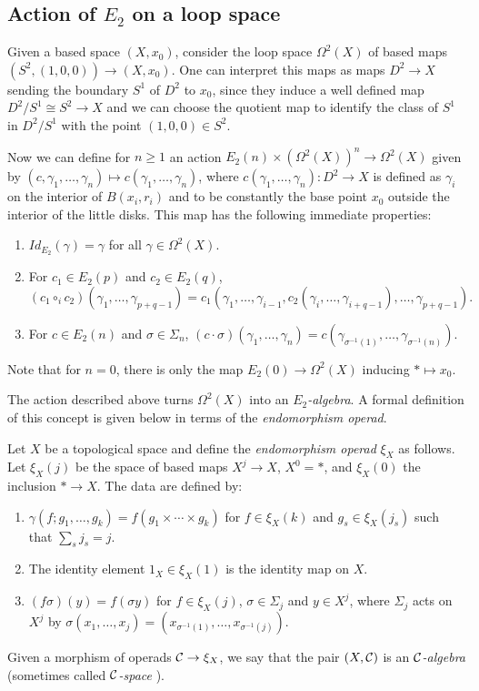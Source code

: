 \documentclass[TFM.tex]{subfiles}
\begin{document}
\subsection{Action of $E_2$ on a loop space}
Given a based space $(X,x_0)$, consider the loop space $\Omega^2(X)$ of based maps $(S^2, (1,0,0))\to (X, x_0)$. One can interpret this maps as maps $D^2\to X$ sending the boundary $S^1$ of $D^2$ to $x_0$, since they induce a well defined map $D^2/S^1\cong S^2\to X$ and we can choose the quotient map to identify the class of $S^1$ in $D^2/S^1$ with the point $(1,0,0)\in S^2$. 

Now we can define for $n\geq 1$ an action $E_2(n)\times (\Omega^2(X))^n\to \Omega^2(X)$ given by $(c,\gamma_1,\dots, \gamma_n)\mapsto c(\gamma_1,\dots, \gamma_n)$, where 
$c(\gamma_1,\dots, \gamma_n):D^2\to X$ is defined as $\gamma_i$ on the interior of $B(x_i,r_i)$ and to be constantly the base point $x_0$ outside the interior of the little disks. This map has the following immediate properties:
\begin{enumerate}
\item $Id_{E_2}(\gamma)=\gamma$ for all $\gamma\in \Omega^2(X)$.
\item For $c_1\in E_2(p)$ and $c_2\in E_2(q)$, 
$$(c_1\circ_i c_2)(\gamma_1,\dots, \gamma_{p+q-1})=c_1(\gamma_1,\dots, \gamma_{i-1}, c_2(\gamma_i,\dots, \gamma_{i+q-1}),\dots, \gamma_{p+q-1}).$$ 
\item For $c\in E_2(n)$ and $\sigma\in\Sigma_n$, $(c\cdot \sigma)(\gamma_1,\dots,\gamma_n)=c(\gamma_{\sigma^{-1}(1)},\dots, \gamma_{\sigma^{-1}(n)})$. 
\end{enumerate}
Note that for $n=0$, there is only the map $E_2(0)\to\Omega^2(X)$ inducing $*\mapsto x_0$. 

The action described above turns $\Omega^2(X)$ into an \emph{$E_2$-algebra}. A formal definition of this concept is given below in terms of the \emph{endomorphism operad}. 


\begin{defi}\label{endomorphism}
Let $X$ be a topological space and define the \emph{endomorphism operad} $\xi_X$ as follows. Let $\xi_X(j)$ be the space of based maps $X^j\to X$, $X^0=*$, and $\xi_X(0)$ the inclusion $*\to X$. The data are defined by:
\begin{enumerate}
\item $\gamma(f;g_1,\dots, g_k)=f(g_1\times\cdots\times g_k)$ for $f\in \xi_X(k)$ and $g_s\in\xi_X(j_s)$ such that $\sum_s j_s=j$.
\item The identity element $1_X\in\xi_X(1)$ is the identity map on $X$.
\item $(f\sigma)(y)=f(\sigma y)$ for $f\in\xi_X(j)$, $\sigma\in\Sigma_j$ and $y\in X^j$, where $\Sigma_j$ acts on $X^j$ by $\sigma(x_1,\dots, x_j)=(x_{\sigma^{-1}(1)},\dots, x_{\sigma^{-1}(j)})$. 
\end{enumerate}

Given a morphism of operads $\mathcal{C}\to \xi_X$, we say that the pair $(X,\mathcal{C})$ is an \emph{$\mathcal{C}$-algebra} (sometimes called \emph{$\mathcal{C}$-space} \cite{May}).
\end{defi}
\end{document}
